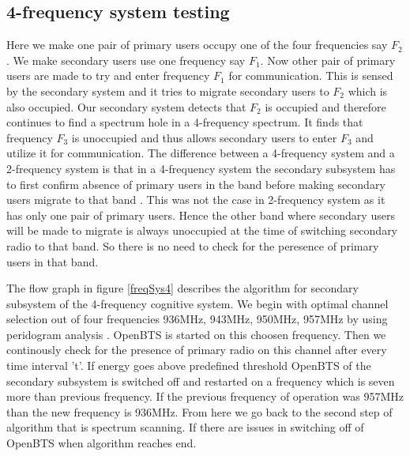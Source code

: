 \subsection{4-frequency system testing}
Here we make one pair of primary users occupy one of the four frequencies say 
$F_2$. We make secondary users use one frequency say $F_1$. Now other pair of 
primary users are made to try and enter frequency $F_1$ for communication. This is sensed by 
the secondary system and it tries to migrate secondary users to $F_2$ which is 
also occupied. Our secondary system detects that $F_2$ is occupied and therefore 
continues to find a spectrum hole in a 4-frequency spectrum. It finds that 
frequency $F_3$ is unoccupied and thus allows secondary users to enter $F_3$ 
and utilize it for communication. The difference between a 4-frequency 
system and a 2-frequency system is that in a 4-frequency 
system the secondary subsystem has to first confirm absence of primary users 
in the band before making secondary users migrate to that band . This was not
the case in 2-frequency system as it has only one 
pair of primary users. Hence the other band where secondary users will be made 
to migrate is always unoccupied at the time of switching secondary radio to 
that band. So there is no need to check for the peresence of primary users in that band.

The flow graph in figure \ref{freqSys4} describes the algorithm for secondary subsystem of the 4-frequency cognitive system.
 We begin with optimal channel selection out of four frequencies 936MHz, 943MHz, 950MHz, 957MHz by using peridogram analysis
. OpenBTS is started on this choosen frequency. Then we continously check for the presence of primary radio on this channel
 after every time interval 't'. If energy goes above predefined threshold OpenBTS of the secondary subsystem is switched
 off and restarted on a frequency which is seven more than previous frequency. If the previous frequency of operation was 
957MHz than the new frequency is 936MHz. From here we go back to the second step of algorithm that is spectrum scanning. If there are issues in switching off of OpenBTS when algorithm reaches end.


